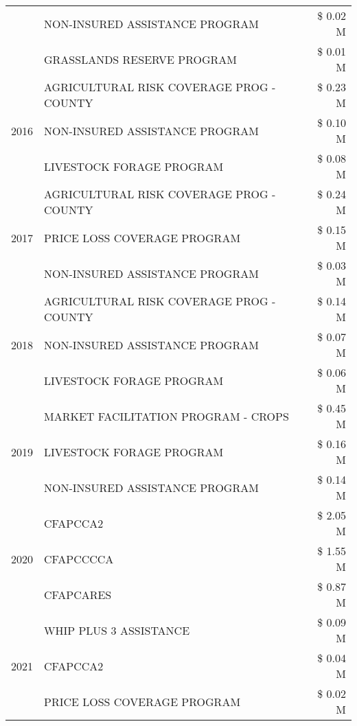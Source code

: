 \begin{tabular}{llr}
 & NON-INSURED ASSISTANCE PROGRAM & \$ 0.02 M \\
 & GRASSLANDS RESERVE PROGRAM & \$ 0.01 M \\
\cline{1-3}
\multirow[t]{3}{*}{2016} & AGRICULTURAL RISK COVERAGE PROG - COUNTY & \$ 0.23 M \\
 & NON-INSURED ASSISTANCE PROGRAM & \$ 0.10 M \\
 & LIVESTOCK FORAGE PROGRAM & \$ 0.08 M \\
\cline{1-3}
\multirow[t]{3}{*}{2017} & AGRICULTURAL RISK COVERAGE PROG - COUNTY & \$ 0.24 M \\
 & PRICE LOSS COVERAGE PROGRAM & \$ 0.15 M \\
 & NON-INSURED ASSISTANCE PROGRAM & \$ 0.03 M \\
\cline{1-3}
\multirow[t]{3}{*}{2018} & AGRICULTURAL RISK COVERAGE PROG - COUNTY & \$ 0.14 M \\
 & NON-INSURED ASSISTANCE PROGRAM & \$ 0.07 M \\
 & LIVESTOCK FORAGE PROGRAM & \$ 0.06 M \\
\cline{1-3}
\multirow[t]{3}{*}{2019} & MARKET FACILITATION PROGRAM - CROPS & \$ 0.45 M \\
 & LIVESTOCK FORAGE PROGRAM & \$ 0.16 M \\
 & NON-INSURED ASSISTANCE PROGRAM & \$ 0.14 M \\
\cline{1-3}
\multirow[t]{3}{*}{2020} & CFAPCCA2 & \$ 2.05 M \\
 & CFAPCCCCA & \$ 1.55 M \\
 & CFAPCARES & \$ 0.87 M \\
\cline{1-3}
\multirow[t]{3}{*}{2021} & WHIP PLUS 3 ASSISTANCE & \$ 0.09 M \\
 & CFAPCCA2 & \$ 0.04 M \\
 & PRICE LOSS COVERAGE PROGRAM & \$ 0.02 M \\
\cline{1-3}
\bottomrule
\end{tabular}
